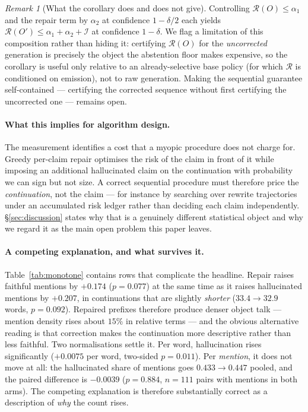 \documentclass[review,number,doubleblind]{elsarticle}
\theoremstyle{plain}
\theoremstyle{definition}
\theoremstyle{remark}
\newtheorem{remark}{Remark}
\newcommand{\Risk}{\mathcal{R}}
\newcommand{\Iota}{\mathcal{I}}
\begin{document}
\begin{remark}[What the corollary does and does not give]
\label{rem:corollary}
Controlling $\Risk(O)\le\alpha_1$ and the repair term by $\alpha_2$ at confidence
$1-\delta/2$ each yields $\Risk(O')\le\alpha_1+\alpha_2+\Iota$ at confidence $1-\delta$. We
flag a limitation of this composition rather than hiding it: certifying $\Risk(O)$ for the
\emph{uncorrected} generation is precisely the object the abstention floor makes expensive,
so the corollary is useful only relative to an already-selective base policy (for which
$\Risk$ is conditioned on emission), not to raw generation. Making the sequential guarantee
self-contained --- certifying the corrected sequence without first certifying the
uncorrected one --- remains open.
\end{remark}

\paragraph{What this implies for algorithm design.}
The measurement identifies a cost that a myopic procedure does not charge for. Greedy per-claim
repair optimises the risk of the claim in front of it while imposing an additional hallucinated
claim on the continuation with probability we can sign but not size. A correct sequential
procedure must therefore price the \emph{continuation}, not the claim --- for instance by
searching over rewrite trajectories under an accumulated risk ledger rather than deciding each
claim independently. \S\ref{sec:discussion} states why that is a genuinely different statistical
object and why we regard it as the main open problem this paper leaves.

\paragraph{A competing explanation, and what survives it.}
Table~\ref{tab:monotone} contains rows that complicate the headline. Repair raises
faithful mentions by $+0.174$ ($p=0.077$) at the same time as it raises hallucinated mentions by
$+0.207$, in continuations that are slightly \emph{shorter} ($33.4\to32.9$ words, $p=0.092$).
Repaired prefixes therefore produce denser object talk --- mention density rises about $15\%$ in
relative terms --- and the obvious alternative reading is that correction makes the continuation
more descriptive rather than less faithful. Two normalisations settle it. Per word, hallucination
rises significantly ($+0.0075$ per word, two-sided $p=0.011$). Per \emph{mention}, it does not
move at all: the hallucinated share of mentions goes $0.433\to0.447$ pooled, and the paired
difference is $-0.0039$ ($p=0.884$, $n=111$ pairs with mentions in both arms). The competing
explanation is therefore substantially correct as a description of \emph{why} the count rises.
\end{document}
